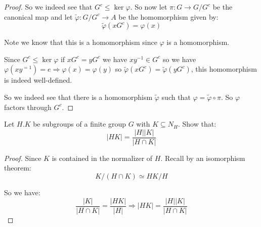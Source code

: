\begin{exercise}
\begin{proof}
            So we indeed see that $G^c\leq \ker \varphi$. So now let $\pi \colon G\rightarrow G/G^c$ be the canonical map and let $\tilde{\varphi}\colon G/G^c \rightarrow A$ be the homomorphism given by:\begin{equation*}
                \tilde{\varphi}(xG^c) =\varphi(x) 
            \end{equation*}

            Note we know that this is a homomorphism since $\varphi$ is a homomorphism.

            Since $G^c \leq \ker\varphi$ if $xG^c = yG^c$ we have $xy^{-1}\in G^c$ so we have $\varphi(xy^{=1}) = e \Rightarrow \varphi(x) = \varphi(y)$ so $\tilde{\varphi}(xG^c) = \tilde{\varphi}(yG^c)$, this homomorphism is indeed well-defined.
        
            So we indeed see that there is a homomorphism $\tilde{\varphi}$ such that $\varphi = \tilde{\varphi}\circ \pi$. So $\varphi$ factors through $G^c$.
        \end{proof}
    \end{exercise}

    \begin{exercise}
        Let $H.K$ be subgroups of a finite group $G$ with $K\subseteq N_H$. Show that:\[|HK| = \frac{|H||K|}{|H\cap K|} \]
    \begin{proof}
        Since $K$ is contained in the normalizer of $H$. Recall by an isomorphism theorem:\[K/(H\cap K) \simeq HK/H \]

        So we have:\begin{equation*}
            \frac{|K|}{|H\cap K|} = \frac{|HK|}{|H|} \Rightarrow |HK| = \frac{|H||K|}{|H\cap K|}
        \end{equation*}
    
    \end{proof}
    \end{exercise}

